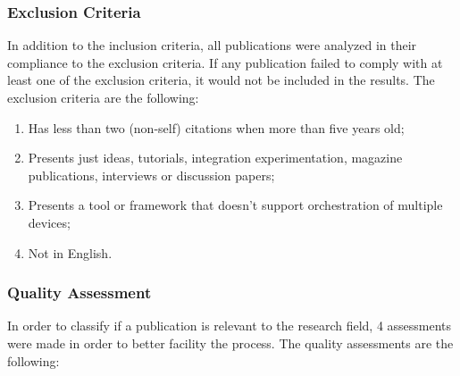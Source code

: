 \subsubsection{Exclusion Criteria}\label{sec:exclusion}

In addition to the inclusion criteria, all publications were analyzed in their compliance to the exclusion criteria. If any publication failed to comply with at least one of the exclusion criteria, it would not be included in the results. The exclusion criteria are the following:

\begin{enumerate}
    \item Has less than two (non-self) citations when more than five years old;
    \item Presents just ideas, tutorials, integration experimentation, magazine publications, interviews or discussion papers;
    \item Presents a tool or framework that doesn't support orchestration of multiple devices;
    \item Not in English.
\end{enumerate}{}

\subsubsection{Quality Assessment}\label{sec:quality_accessment}

In order to classify if a publication is relevant to the research field, 4 assessments were made in order to better facility the process. The quality assessments are the following:\\

\captionsetup{belowskip=12pt,aboveskip=4pt}
\begin{table}[ht]
    \centering
    \caption{Parameters for measuring the quality of a publication}
    \label{tab:quality_assessment}
\end{table}{}

